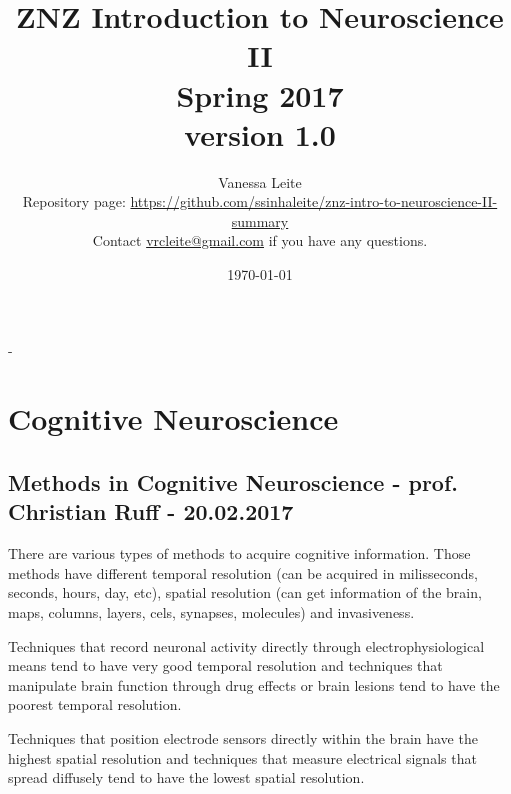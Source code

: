 \documentclass[12pt,article,oneside,a4paper]{memoir}
\title{\textbf{ZNZ Introduction to Neuroscience II} \\
       Spring 2017\\\normalsize version 1.0}
\author{
	Vanessa Leite
	\vspace{2em}
	\\Repository page: \url{https://github.com/ssinhaleite/znz-intro-to-neuroscience-II-summary}\\
	Contact \href{mailto:vrcleite@gmail.com}{vrcleite@gmail.com} if you have any questions.}
\date{\today}
\begin{document}
\frontmatter


\begin{titlingpage}
  \calccentering{\unitlength}
  \begin{adjustwidth*}{\unitlength-24pt}{-\unitlength-24pt}
    \maketitle
  \end{adjustwidth*}
\end{titlingpage}

\mainmatter



\newpage
\clearpage
{}
\setcounter{tocdepth}{3}
\setcounter{secnumdepth}{2}
\tableofcontents

\clearpage
{}

\section{Cognitive Neuroscience}

\subsection{Methods in Cognitive Neuroscience - prof. Christian Ruff - 20.02.2017}

There are various types of methods to acquire cognitive information. Those methods have
different temporal resolution (can be acquired in milisseconds, seconds, hours, day,
etc), spatial resolution (can get information of the brain, maps, columns, layers, cels,
synapses, molecules) and invasiveness.

Techniques that record neuronal activity directly through electrophysiological means
tend to have very good temporal resolution and techniques that manipulate brain function
through drug effects or brain lesions tend to have the poorest temporal resolution.

Techniques that position electrode sensors directly within the brain have the highest
spatial resolution and techniques that measure electrical signals that spread diffusely
tend to have the lowest spatial resolution.
\end{document}
